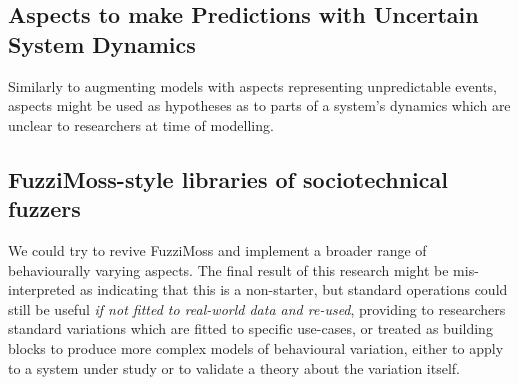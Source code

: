 






\subsection{Aspects to make Predictions with Uncertain System Dynamics}



Similarly to augmenting models with aspects representing unpredictable events,
aspects might be used as hypotheses as to parts of a system's dynamics which are
unclear to researchers at time of modelling. 


\subsection{FuzziMoss-style libraries of sociotechnical
fuzzers}\label{future_work_revive_fuzzimoss}

We could try to revive FuzziMoss and implement a broader range of behaviourally
varying aspects. The final result of this research might be mis-interpreted as
indicating that this is a non-starter, but standard operations could still be
useful \emph{if not fitted to real-world data and re-used}, providing to
researchers standard variations which are fitted to specific use-cases, or
treated as building blocks to produce more complex models of behavioural
variation, either to apply to a system under study or to validate a theory about
the variation itself.



